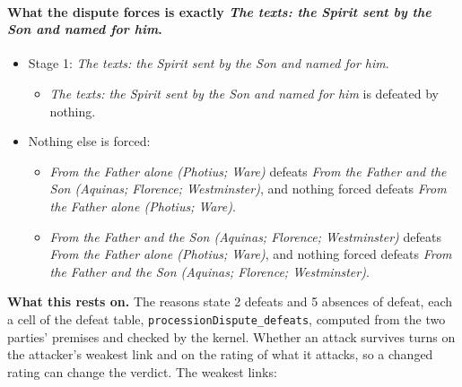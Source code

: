 \documentclass[11pt,paper=\testimonypaper,DIV=13,parskip=false]{scrartcl}
\begin{document}
\paragraph{What the dispute forces is exactly \emph{The texts: the Spirit sent by the Son and named for him}.}
\begin{itemize}
\item Stage 1: \emph{The texts: the Spirit sent by the Son and named for him}.
\begin{itemize}
\item \emph{The texts: the Spirit sent by the Son and named for him} is defeated by nothing.
\end{itemize}
\item Nothing else is forced:
\begin{itemize}
\item \emph{From the Father alone (Photius; Ware)} defeats \emph{From the Father and the Son (Aquinas; Florence; Westminster)}, and nothing forced defeats \emph{From the Father alone (Photius; Ware)}.
\item \emph{From the Father and the Son (Aquinas; Florence; Westminster)} defeats \emph{From the Father alone (Photius; Ware)}, and nothing forced defeats \emph{From the Father and the Son (Aquinas; Florence; Westminster)}.
\end{itemize}
\end{itemize}
\par\noindent\textbf{What this rests on.} The reasons state 2 defeats and 5 absences of defeat, each a cell of the defeat table, \texttt{procession\allowbreak{}Dispute\_\allowbreak{}defeats}, computed from the two parties' premises and checked by the kernel. Whether an attack survives turns on the attacker's weakest link and on the rating of what it attacks, so a changed rating can change the verdict. The weakest links:
\end{document}
